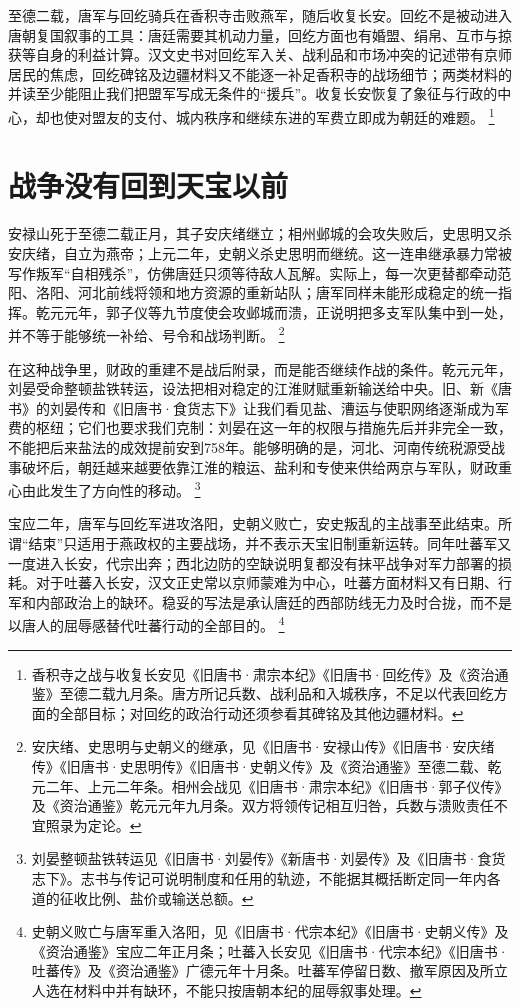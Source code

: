 至德二载，唐军与回纥骑兵在香积寺击败燕军，随后收复长安。回纥不是被动进入唐朝复国叙事的工具：唐廷需要其机动力量，回纥方面也有婚盟、绢帛、互市与掠获等自身的利益计算。汉文史书对回纥军入关、战利品和市场冲突的记述带有京师居民的焦虑，回纥碑铭及边疆材料又不能逐一补足香积寺的战场细节；两类材料的并读至少能阻止我们把盟军写成无条件的“援兵”。收复长安恢复了象征与行政的中心，却也使对盟友的支付、城内秩序和继续东进的军费立即成为朝廷的难题。%
\footnote{香积寺之战与收复长安见《旧唐书·肃宗本纪》《旧唐书·回纥传》及《资治通鉴》至德二载九月条。唐方所记兵数、战利品和入城秩序，不足以代表回纥方面的全部目标；对回纥的政治行动还须参看其碑铭及其他边疆材料。}

\section{战争没有回到天宝以前}

安禄山死于至德二载正月，其子安庆绪继立；相州邺城的会攻失败后，史思明又杀安庆绪，自立为燕帝；上元二年，史朝义杀史思明而继统。这一连串继承暴力常被写作叛军“自相残杀”，仿佛唐廷只须等待敌人瓦解。实际上，每一次更替都牵动范阳、洛阳、河北前线将领和地方资源的重新站队；唐军同样未能形成稳定的统一指挥。乾元元年，郭子仪等九节度使会攻邺城而溃，正说明把多支军队集中到一处，并不等于能够统一补给、号令和战场判断。%
\footnote{安庆绪、史思明与史朝义的继承，见《旧唐书·安禄山传》《旧唐书·安庆绪传》《旧唐书·史思明传》《旧唐书·史朝义传》及《资治通鉴》至德二载、乾元二年、上元二年条。相州会战见《旧唐书·肃宗本纪》《旧唐书·郭子仪传》及《资治通鉴》乾元元年九月条。双方将领传记相互归咎，兵数与溃败责任不宜照录为定论。}

在这种战争里，财政的重建不是战后附录，而是能否继续作战的条件。乾元元年，刘晏受命整顿盐铁转运，设法把相对稳定的江淮财赋重新输送给中央。旧、新《唐书》的刘晏传和《旧唐书·食货志下》让我们看见盐、漕运与使职网络逐渐成为军费的枢纽；它们也要求我们克制：刘晏在这一年的权限与措施先后并非完全一致，不能把后来盐法的成效提前安到758年。能够明确的是，河北、河南传统税源受战事破坏后，朝廷越来越要依靠江淮的粮运、盐利和专使来供给两京与军队，财政重心由此发生了方向性的移动。%
\footnote{刘晏整顿盐铁转运见《旧唐书·刘晏传》《新唐书·刘晏传》及《旧唐书·食货志下》。志书与传记可说明制度和任用的轨迹，不能据其概括断定同一年内各道的征收比例、盐价或输送总额。}

宝应二年，唐军与回纥军进攻洛阳，史朝义败亡，安史叛乱的主战事至此结束。所谓“结束”只适用于燕政权的主要战场，并不表示天宝旧制重新运转。同年吐蕃军又一度进入长安，代宗出奔；西北边防的空缺说明复都没有抹平战争对军力部署的损耗。对于吐蕃入长安，汉文正史常以京师蒙难为中心，吐蕃方面材料又有日期、行军和内部政治上的缺环。稳妥的写法是承认唐廷的西部防线无力及时合拢，而不是以唐人的屈辱感替代吐蕃行动的全部目的。%
\footnote{史朝义败亡与唐军重入洛阳，见《旧唐书·代宗本纪》《旧唐书·史朝义传》及《资治通鉴》宝应二年正月条；吐蕃入长安见《旧唐书·代宗本纪》《旧唐书·吐蕃传》及《资治通鉴》广德元年十月条。吐蕃军停留日数、撤军原因及所立人选在材料中并有缺环，不能只按唐朝本纪的屈辱叙事处理。}

